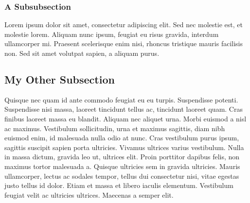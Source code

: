         \subsubsection{A Subsubsection}
        \label{ssub:a_subsubsection}
            Lorem ipsum dolor sit amet, consectetur adipiscing elit. Sed nec molestie est, et molestie lorem. Aliquam nunc ipsum, feugiat eu risus gravida, interdum ullamcorper mi. Praesent scelerisque enim nisi, rhoncus tristique mauris facilisis non. Sed sit amet volutpat sapien, a aliquam purus.

    \subsection{My Other Subsection}
    \label{sub:my_other_subsection}
        Quisque nec quam id ante commodo feugiat eu eu turpis. Suspendisse potenti. Suspendisse nisi massa, laoreet tincidunt tellus ac, tincidunt laoreet quam. Cras finibus laoreet massa eu blandit. Aliquam nec aliquet urna. Morbi euismod a nisl ac maximus. Vestibulum sollicitudin, urna et maximus sagittis, diam nibh euismod enim, id malesuada nulla odio at nunc. Cras vestibulum purus ipsum, sagittis suscipit sapien porta ultricies. Vivamus ultrices varius vestibulum. Nulla in massa dictum, gravida leo ut, ultrices elit. Proin porttitor dapibus felis, non maximus tortor malesuada a. Quisque ultricies sem in gravida ultricies. Mauris ullamcorper, lectus ac sodales tempor, tellus dui consectetur nisi, vitae egestas justo tellus id dolor. Etiam et massa et libero iaculis elementum. Vestibulum feugiat velit ac ultricies ultrices. Maecenas a semper elit.
